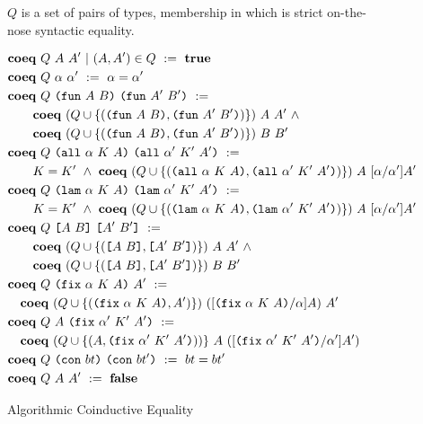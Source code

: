 \documentclass[../main.tex]{subfiles}
\begin{document}
\begin{figure*}
    $Q$ is a set of pairs of types, membership in which is strict on-the-nose syntactic equality.
    
    \begin{align*}
        &\coeqF{Q}{A}{A'} ~|~ (A,A') \in Q ~ := ~ \mathbf{true}\\
        &\coeqF{Q}{\alpha}{\alpha'} ~ := ~ \alpha = \alpha'\\
        &\coeqF{Q}{\funT{A}{B}}{\funT{A'}{B'}} ~ :=\\
          &\qquad \coeqF{(Q \cup \{(\funT{A}{B},\funT{A'}{B'})\})}{A}{A'} ~ \wedge ~\\
          &\qquad \coeqF{(Q \cup \{(\funT{A}{B},\funT{A'}{B'})\})}{B}{B'}\\
        &\coeqF{Q}{\allT{\alpha}{K}{A}}{\allT{\alpha'}{K'}{A'}} ~ :=\\
          &\qquad K = K' ~ \wedge ~ \coeqF{(Q \cup \{(\allT{\alpha}{K}{A},\allT{\alpha'}{K'}{A'})\})}{A}{\subst{\alpha}{\alpha'}{A'}}\\
        &\coeqF{Q}{\lamT{\alpha}{K}{A}}{\lamT{\alpha'}{K'}{A'}} ~ :=\\
          &\qquad K = K' ~ \wedge ~ \coeqF{(Q \cup \{(\lamT{\alpha}{K}{A},\lamT{\alpha'}{K'}{A'})\})}{A}{\subst{\alpha}{\alpha'}{A'}}\\
        &\coeqF{Q}{\appT{A}{B}}{\appT{A'}{B'}} ~ :=\\
          &\qquad \coeqF{(Q \cup \{(\appT{A}{B},\appT{A'}{B'})\})}{A}{A'} ~ \wedge ~\\
          &\qquad \coeqF{(Q \cup \{(\appT{A}{B},\appT{A'}{B'})\})}{B}{B'}\\
        &\coeqF{Q}{\fixT{\alpha}{K}{A}}{A'} ~ :=\\
          &\quad\coeqF{(Q \cup \{(\fixT{\alpha}{K}{A},A')\})}{(\subst{\fixT{\alpha}{K}{A}}{\alpha}{A})}{A'}\\
        &\coeqF{Q}{A}{\fixT{\alpha'}{K'}{A'}} ~ :=\\
          &\quad\coeqF{(Q \cup \{(A,\fixT{\alpha'}{K'}{A'}))\}}{A}{(\subst{\fixT{\alpha'}{K'}{A'}}{\alpha'}{A'})}\\
        &\coeqF{Q}{\conT{bt}}{\conT{bt'}} ~ := ~ bt = bt'\\
        &\coeqF{Q}{A}{A'} ~ := ~ \mathbf{false}\\
    \end{align*}
    
    \caption{Algorithmic Coinductive Equality}
    \label{fig:Plutus_core_computable_coinductive_equality}
\end{figure*}
\end{document}
